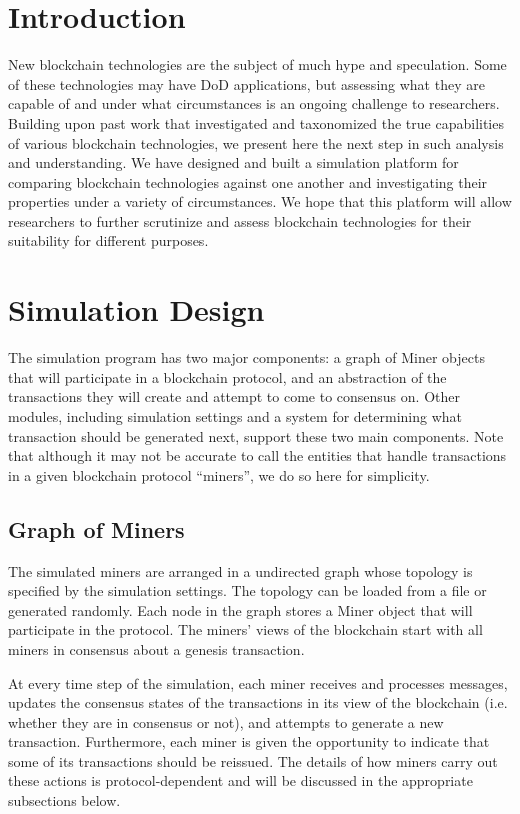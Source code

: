 \documentclass[letterpaper,11pt]{article}
\begin{document}
\section{Introduction}
New blockchain technologies are the subject of much hype and speculation. Some of these technologies may have DoD applications, but assessing what they are capable of and under what circumstances is an ongoing challenge to researchers. Building upon past work that investigated and taxonomized the true capabilities of various blockchain technologies, we present here the next step in such analysis and understanding. We have designed and built a simulation platform for comparing blockchain technologies against one another and investigating their properties under a variety of circumstances. We hope that this platform will allow researchers to further scrutinize and assess blockchain technologies for their suitability for different purposes.

\section{Simulation Design}
The simulation program has two major components: a graph of Miner objects that will participate in a blockchain protocol, and an abstraction of the transactions they will create and attempt to come to consensus on. Other modules, including simulation settings and a system for determining what transaction should be generated next, support these two main components. Note that although it may not be accurate to call the entities that handle transactions in a given blockchain protocol ``miners'', we do so here for simplicity.

\subsection{Graph of Miners}
The simulated miners are arranged in a undirected graph whose topology is specified by the simulation settings. The topology can be loaded from a file or generated randomly. Each node in the graph stores a Miner object that will participate in the protocol. The miners' views of the blockchain start with all miners in consensus about a genesis transaction.

At every time step of the simulation, each miner receives and processes messages, updates the consensus states of the transactions in its view of the blockchain (i.e. whether they are in consensus or not), and attempts to generate a new transaction. Furthermore, each miner is given the opportunity to indicate that some of its transactions should be reissued. The details of how miners carry out these actions is protocol-dependent and will be discussed in the appropriate subsections below.
\end{document}
